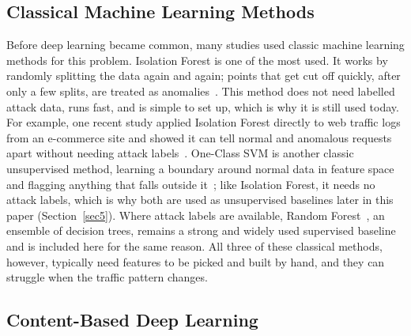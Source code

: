 \documentclass[futureinternet,article,submit,moreauthors]{Definitions/mdpi}
\begin{document}
\subsection{Classical Machine Learning Methods}

Before deep learning became common, many studies used classic machine learning methods for this problem. Isolation Forest is one of the most used. It works by randomly splitting the data again and again; points that get cut off quickly, after only a few splits, are treated as anomalies~\cite{liu2008}. This method does not need labelled attack data, runs fast, and is simple to set up, which is why it is still used today. For example, one recent study applied Isolation Forest directly to web traffic logs from an e-commerce site and showed it can tell normal and anomalous requests apart without needing attack labels~\cite{chua2024}. One-Class SVM is another classic unsupervised method, learning a boundary around normal data in feature space and flagging anything that falls outside it~\cite{scholkopf2001}; like Isolation Forest, it needs no attack labels, which is why both are used as unsupervised baselines later in this paper (Section~\ref{sec5}). Where attack labels are available, Random Forest~\cite{breiman2001}, an ensemble of decision trees, remains a strong and widely used supervised baseline and is included here for the same reason. All three of these classical methods, however, typically need features to be picked and built by hand, and they can struggle when the traffic pattern changes.

\subsection{Content-Based Deep Learning}
\end{document}
